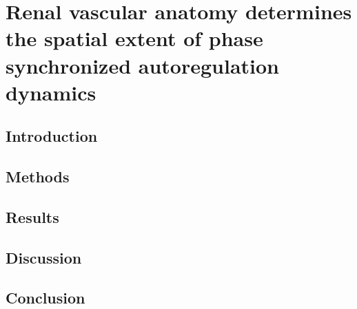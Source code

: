 \chapter{Renal vascular anatomy determines the spatial extent of phase synchronized autoregulation dynamics}

\section{Introduction}

\section{Methods}

\section{Results}

\section{Discussion}

\section{Conclusion}